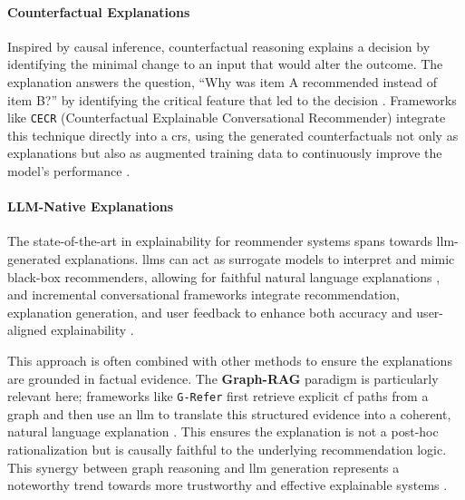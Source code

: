 \paragraph{Counterfactual Explanations}
Inspired by causal inference, counterfactual reasoning explains a decision by identifying the minimal change to an input that would alter the outcome. The explanation answers the question, ``Why was item A recommended instead of item B?'' by identifying the critical feature that led to the decision \cite{SOTA-COUNTERFACTUAL-EXP-REC}. Frameworks like \texttt{CECR} (Counterfactual Explainable Conversational Recommender) integrate this technique directly into a \ac{crs}, using the generated counterfactuals not only as explanations but also as augmented training data to continuously improve the model's performance \cite{SOTA-CECR}.

\paragraph{LLM-Native Explanations}
The state-of-the-art in explainability for reommender systems spans towards \ac{llm}-generated explanations. \acp{llm} can act as surrogate models to interpret and mimic black-box recommenders, allowing for faithful natural language explanations \cite{SOTA-LLM-REC-EXPLAIN}, and incremental conversational frameworks integrate recommendation, explanation generation, and user feedback to enhance both accuracy and user-aligned explainability \cite{TOWARDS-EXP-CRS}.

This approach is often combined with other methods to ensure the explanations are grounded in factual evidence. The \textbf{Graph-RAG} paradigm is particularly relevant here; frameworks like \texttt{G-Refer} first retrieve explicit \acl{cf} paths from a graph and then use an \ac{llm} to translate this structured evidence into a coherent, natural language explanation \cite{G-REFER}. This ensures the explanation is not a post-hoc rationalization but is causally faithful to the underlying recommendation logic. This synergy between graph reasoning and \ac{llm} generation represents a noteworthy trend towards more trustworthy and effective explainable systems \cite{SOTA-RECSYS-EXPLAIN-KG, SOTA-CRS-EXPLAIN}.